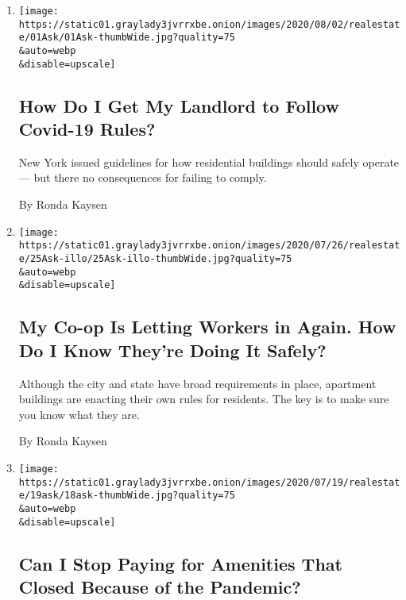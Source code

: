 \begin{enumerate}
\def\labelenumi{\arabic{enumi}.}
\item
  \href{/2020/08/01/realestate/coronavirus-covid-apartment-buildings.html}{}

  \texttt{[image: https://static01.graylady3jvrrxbe.onion/images/2020/08/02/realestate/01Ask/01Ask-thumbWide.jpg?quality=75\\\&auto=webp\\\&disable=upscale]}

  \hypertarget{how-do-i-get-my-landlord-to-follow-covid-19-rules}{%
  \subsection{How Do I Get My Landlord to Follow Covid-19
  Rules?}\label{how-do-i-get-my-landlord-to-follow-covid-19-rules}}

  New York issued guidelines for how residential buildings should safely
  operate --- but there no consequences for failing to comply.

  By Ronda Kaysen
\item
  \href{/2020/07/25/realestate/coronavirus-reopening-workers-in-buildings-rules.html}{}

  \texttt{[image: https://static01.graylady3jvrrxbe.onion/images/2020/07/26/realestate/25Ask-illo/25Ask-illo-thumbWide.jpg?quality=75\\\&auto=webp\\\&disable=upscale]}

  \hypertarget{my-co-op-is-letting-workers-in-again-how-do-i-know-theyre-doing-it-safely}{%
  \subsection{My Co-op Is Letting Workers in Again. How Do I Know
  They're Doing It
  Safely?}\label{my-co-op-is-letting-workers-in-again-how-do-i-know-theyre-doing-it-safely}}

  Although the city and state have broad requirements in place,
  apartment buildings are enacting their own rules for residents. The
  key is to make sure you know what they are.

  By Ronda Kaysen
\item
  \href{/2020/07/18/realestate/gym-playroom-fees-coronavirus.html}{}

  \texttt{[image: https://static01.graylady3jvrrxbe.onion/images/2020/07/19/realestate/19ask/18ask-thumbWide.jpg?quality=75\\\&auto=webp\\\&disable=upscale]}

  \hypertarget{can-i-stop-paying-for-amenities-that-closed-because-of-the-pandemic}{%
  \subsection{Can I Stop Paying for Amenities That Closed Because of the
  Pandemic?}\label{can-i-stop-paying-for-amenities-that-closed-because-of-the-pandemic}}


\end{enumerate}
